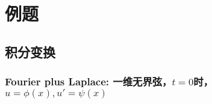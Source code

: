\documentclass[a4paper, 11pt]{article}
\begin{document}
\section{例题}
\subsection{积分变换}
\subsubsection{Fourier plus Laplace: 一维无界弦，$t=0$时，$u = \phi(x), u' = \psi(x)$}
\end{document}
